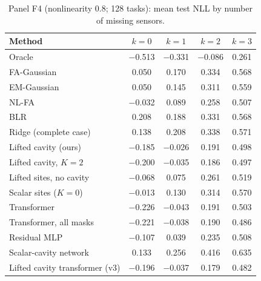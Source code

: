 \begin{table}[h]
\centering\small
\caption{\label{tab:moreF4}Panel F4 (nonlinearity 0.8; 128 tasks): mean test NLL by number of missing sensors.}
\begin{tabular}{lcccc}
\toprule
Method & $k{=}0$ & $k{=}1$ & $k{=}2$ & $k{=}3$\\
\midrule
Oracle & $-$0.513 & $-$0.331 & $-$0.086 & 0.261\\
FA-Gaussian & 0.050 & 0.170 & 0.334 & 0.568\\
EM-Gaussian & 0.050 & 0.145 & 0.311 & 0.559\\
NL-FA & $-$0.032 & 0.089 & 0.258 & 0.507\\
BLR & 0.208 & 0.188 & 0.331 & 0.568\\
Ridge (complete case) & 0.138 & 0.208 & 0.338 & 0.571\\
Lifted cavity (ours) & $-$0.185 & $-$0.026 & 0.191 & 0.498\\
Lifted cavity, $K=2$ & $-$0.200 & $-$0.035 & 0.186 & 0.497\\
Lifted sites, no cavity & $-$0.068 & 0.075 & 0.261 & 0.519\\
Scalar sites ($K=0$) & $-$0.013 & 0.130 & 0.314 & 0.570\\
Transformer & $-$0.226 & $-$0.043 & 0.191 & 0.503\\
Transformer, all masks & $-$0.221 & $-$0.038 & 0.190 & 0.486\\
Residual MLP & $-$0.107 & 0.039 & 0.235 & 0.508\\
Scalar-cavity network & 0.133 & 0.256 & 0.416 & 0.635\\
Lifted cavity transformer (v3) & $-$0.196 & $-$0.037 & 0.179 & 0.482\\
\bottomrule
\end{tabular}
\end{table}


